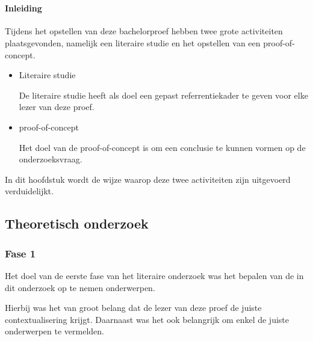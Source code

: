 
\chapter{}%
\label{ch:methodologie}


\subsubsection{Inleiding}
Tijdens het opstellen van deze bachelorproef hebben twee grote activiteiten plaatsgevonden, namelijk een literaire studie en het opstellen van een proof-of-concept. 

\begin{itemize}
    \item Literaire studie
    
    De literaire studie heeft als doel een gepast referrentiekader te geven voor elke lezer van deze proef.
    
    \item proof-of-concept
    
    Het doel van de proof-of-concept is om een conclusie te kunnen vormen op de onderzoeksvraag.
\end{itemize}

In dit hoofdstuk wordt de wijze waarop deze twee activiteiten zijn uitgevoerd verduidelijkt.

\section{Theoretisch onderzoek}
\subsection{Fase 1}
Het doel van de eerste fase van het literaire onderzoek was het bepalen van de in dit onderzoek op te nemen onderwerpen. 

Hierbij was het van groot belang dat de lezer van deze proef de juiste contextualisering krijgt. Daarnaast was het ook belangrijk om enkel de juiste onderwerpen te vermelden.

